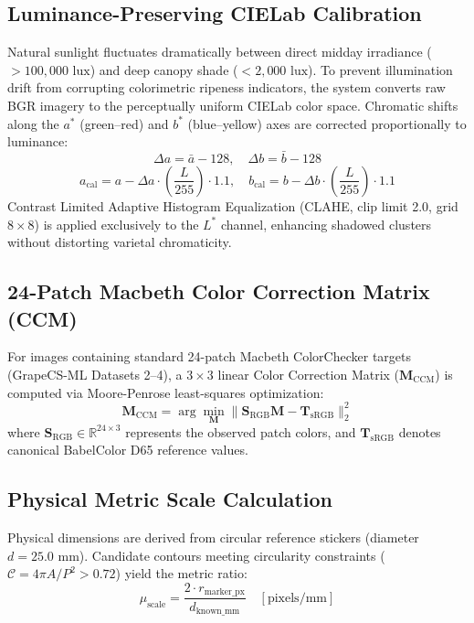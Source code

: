 \documentclass[conference]{IEEEtran}
\begin{document}
\subsection{Luminance-Preserving CIELab Calibration}
Natural sunlight fluctuates dramatically between direct midday irradiance ($>100,000\text{ lux}$) and deep canopy shade ($<2,000\text{ lux}$). To prevent illumination drift from corrupting colorimetric ripeness indicators, the system converts raw BGR imagery to the perceptually uniform CIELab color space. Chromatic shifts along the $a^*$ (green--red) and $b^*$ (blue--yellow) axes are corrected proportionally to luminance:
\begin{equation}
\Delta a = \bar{a} - 128, \quad \Delta b = \bar{b} - 128
\end{equation}
\begin{equation}
a_{\text{cal}} = a - \Delta a \cdot \left(\frac{L}{255}\right) \cdot 1.1, \quad b_{\text{cal}} = b - \Delta b \cdot \left(\frac{L}{255}\right) \cdot 1.1
\end{equation}
Contrast Limited Adaptive Histogram Equalization (CLAHE, clip limit 2.0, grid $8\times 8$) is applied exclusively to the $L^*$ channel, enhancing shadowed clusters without distorting varietal chromaticity.

\subsection{24-Patch Macbeth Color Correction Matrix (CCM)}
For images containing standard 24-patch Macbeth ColorChecker targets (GrapeCS-ML Datasets 2--4), a $3 \times 3$ linear Color Correction Matrix ($\mathbf{M}_{\text{CCM}}$) is computed via Moore-Penrose least-squares optimization:
\begin{equation}
\mathbf{M}_{\text{CCM}} = \arg\min_{\mathbf{M}} \|\mathbf{S}_{\text{RGB}} \mathbf{M} - \mathbf{T}_{\text{sRGB}}\|_2^2
\end{equation}
where $\mathbf{S}_{\text{RGB}} \in \mathbb{R}^{24 \times 3}$ represents the observed patch colors, and $\mathbf{T}_{\text{sRGB}}$ denotes canonical BabelColor D65 reference values.

\subsection{Physical Metric Scale Calculation}
Physical dimensions are derived from circular reference stickers (diameter $d = 25.0\text{ mm}$). Candidate contours meeting circularity constraints ($\mathcal{C} = 4\pi A / P^2 > 0.72$) yield the metric ratio:
\begin{equation}
\mu_{\text{scale}} = \frac{2 \cdot r_{\text{marker\_px}}}{d_{\text{known\_mm}}} \quad [\text{pixels/mm}]
\end{equation}
\end{document}
